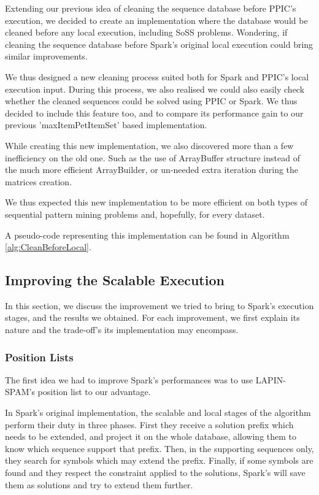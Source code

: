 \documentclass{eplmastersthesis}
\begin{document}
Extending our previous idea of cleaning the sequence database before PPIC's execution, we decided to create an implementation where the database would be cleaned before any local execution, including \acrshort{SoSS} problems. Wondering, if cleaning the sequence database before Spark's original local execution could bring similar improvements. \newline

We thus designed a new cleaning process suited both for Spark and PPIC's local execution input. During this process, we also realised we could also easily check whether the cleaned sequences could be solved using PPIC or Spark. We thus decided to include this feature too, and to compare its performance gain to our previous 'maxItemPetItemSet' based implementation. \newline

While creating this new implementation, we also discovered more than a few inefficiency on the old one. Such as the use of ArrayBuffer structure instead of the much more efficient ArrayBuilder, or un-needed extra iteration during the matrices creation. \newline

We thus expected this new implementation to be more efficient on both types of sequential pattern mining problems and, hopefully, for every dataset. \newline

A pseudo-code representing this implementation can be found in Algorithm \ref{alg:CleanBeforeLocal}.

\subsection{Improving the Scalable Execution}

In this section, we discuss the improvement we tried to bring to Spark's execution stages, and the results we obtained. For each improvement, we first explain its nature and the trade-off's its implementation may encompass.

\subsubsection{Position Lists}

The first idea we had to improve Spark's performances was to use LAPIN-SPAM's position list to our advantage. \newline

In Spark's original implementation, the scalable and local stages of the algorithm perform their duty in three phases. First they receive a solution prefix which needs to be extended, and project it on the whole database, allowing them to know which sequence support that prefix. Then, in the supporting sequences only, they search for symbols which may extend the prefix. Finally, if some symbols are found and they respect the constraint applied to the solutions, Spark's will save them as solutions and try to extend them further. \newline
\end{document}
